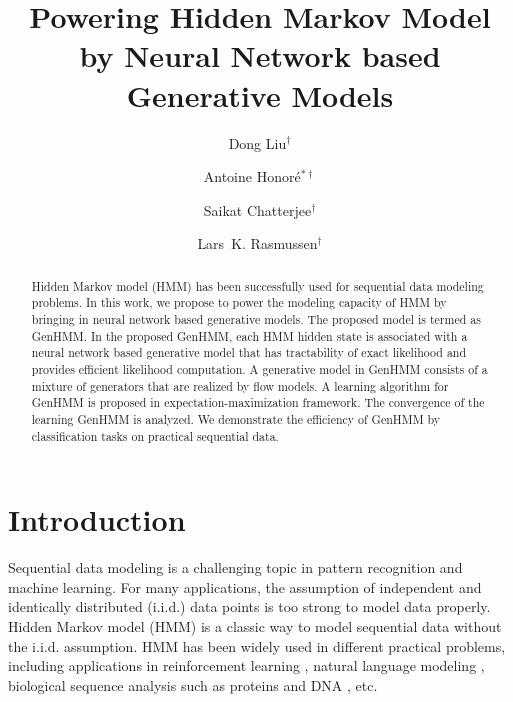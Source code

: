 \documentclass{ecai}
\begin{document}
\title{Powering Hidden Markov Model by Neural Network based Generative Models}
\author{
  Dong Liu$^{\dagger}$ \and
  Antoine Honor\'e$^{\ast \dagger}$ \and
  Saikat Chatterjee$^{\dagger}$ \and
  Lars~K. Rasmussen$^{\dagger}$
  }




\maketitle








\begin{abstract}
Hidden Markov model (HMM) has been successfully used for sequential
data modeling problems.
In this work, we propose to power the modeling capacity of HMM by
bringing in neural network based generative models.
The proposed model is termed as GenHMM.
In the proposed GenHMM, each HMM hidden state is associated with a
neural network based generative model that has
tractability of exact likelihood and provides efficient likelihood
computation.
A generative model in GenHMM consists of a mixture of generators
that are realized by flow models.
A learning algorithm for GenHMM is proposed in
expectation-maximization framework.
The convergence of the learning GenHMM is analyzed.
We demonstrate the efficiency of GenHMM by classification tasks on practical sequential data.
\end{abstract}

\section{Introduction}
Sequential data modeling is a challenging topic in pattern recognition and machine learning. For many applications, the assumption of independent and identically distributed (i.i.d.) data points is too strong to model data properly. Hidden Markov model (HMM) is a classic way to model sequential data without the i.i.d. assumption. HMM has been widely used in different practical problems, including applications in reinforcement learning \cite{ding2018reinforcementhmm,levine2018reinforcementReview}, natural language modeling \cite{khan2016survey,Hariyanti_2019}, biological sequence analysis such as proteins \cite{ASHWIN20172} and DNA \cite{ren2015dna}, etc.
\end{document}

